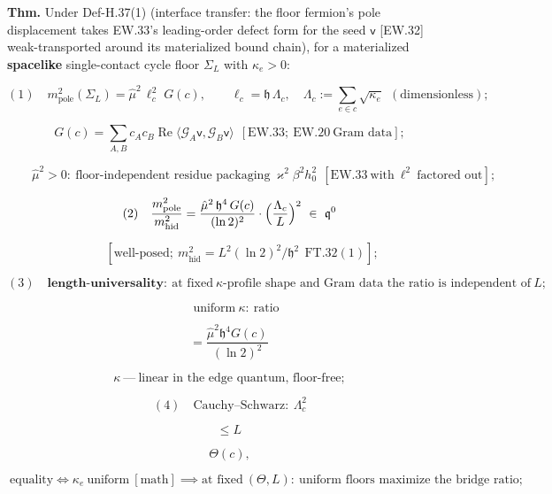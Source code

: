 \begin{theorem}\label{tag:FT-33}
\textbf{Thm.} Under Def-H.37(1) (interface transfer: the floor fermion's pole displacement takes EW.33's leading-order defect form for the seed $\mathsf v$ [EW.32] weak-transported around its materialized bound chain), for a materialized \textbf{spacelike} single-contact cycle floor $\Sigma_L$ with $\kappa_e>0$:

\[
(1)\quad m_{\mathrm{pole}}^2(\Sigma_L)=\hat\mu^2\,\ell_c^2\;G(c),\qquad\ell_c=\mathfrak h\,\Lambda_c,\quad\Lambda_c:=\sum_{e\in c}\sqrt{\kappa_e}\ \ (\text{dimensionless});
\]

\[
G(c)=\sum_{A,B}c_Ac_B\operatorname{Re}\langle\mathcal G_A\mathsf v,\mathcal G_B\mathsf v\rangle\ \ [\mathrm{EW.33};\ \mathrm{EW.20}\ \text{Gram data}];
\]

\[
\qquad \hat\mu^2>0:\ \text{floor-independent residue packaging}\ \varkappa^2\beta^2h_0^2\ \ [\mathrm{EW.33}\ \text{with}\ \ell^2\ \text{factored out}];
\]

\[
(2)\quad\frac{m_{\mathrm{pole}}^2}{m_{\mathrm{hid}}^2}=\frac{\hat\mu^2\,\mathfrak h^4\,G(c)}{(\ln2)^2}\cdot\Bigl(\frac{\Lambda_c}{L}\Bigr)^{2}\ \in\ \mathfrak q^0
\]

\[
\qquad [\text{well-posed};\ m_{\mathrm{hid}}^2=L^2(\ln2)^2/\mathfrak h^2\ \ \mathrm{FT.32}(1)];
\]

\[
(3)\quad\textbf{length-universality}:\ \text{at fixed}\ \kappa\text{-profile shape and Gram data the ratio is independent of}\ L;
\]

\[
\quad\text{uniform}\ \kappa:\ \text{ratio}
\]

\[
= \frac{\hat\mu^2\mathfrak h^4G(c)}{(\ln2)^2}\,
\]

\[
\kappa\ —\ \text{linear in the edge quantum, floor-free};
\]

\[
(4)\quad\text{Cauchy–Schwarz}:\ \Lambda_c^2
\]

\[
\le L\,
\]

\[
\Theta(c),
\]

\[
\ \text{equality}\iff\kappa_e\ \text{uniform}\ [\text{math}]\implies\text{at fixed}\ (\Theta,L):\ \text{uniform floors maximize the bridge ratio};
\]


\end{theorem}
